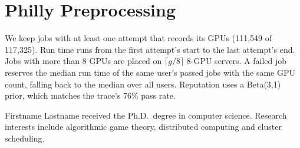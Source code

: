 \documentclass[journal]{IEEEtran}
\theoremstyle{remark}
\begin{document}
\section{Philly Preprocessing}
We keep jobs with at least one attempt that records its GPUs (111{,}549 of 117{,}325). Run time runs from the first attempt's start to the last attempt's end. Jobs with more than 8 GPUs are placed on $\lceil g/8\rceil$ 8-GPU servers. A failed job reserves the median run time of the same user's passed jobs with the same GPU count, falling back to the median over all users. Reputation uses a Beta(3,1) prior, which matches the trace's 76\% pass rate.

\begin{IEEEbiographynophoto}{Firstname Lastname}
received the Ph.D.\ degree in computer science. Research interests include algorithmic game theory, distributed computing and cluster scheduling.
\end{IEEEbiographynophoto}
\end{document}
